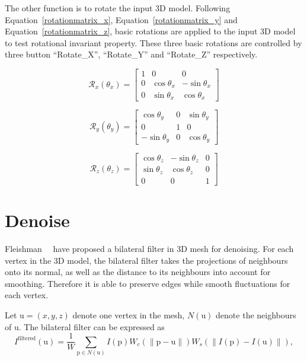 The other function is to rotate the input 3D model. Following Equation~\ref{rotationmatrix_x}, Equation~\ref{rotationmatrix_y} and Equation~\ref{rotationmatrix_z}, basic rotations are applied to the input 3D model to test rotational invariant property. These three basic rotations are controlled by three button ``Rotate\_X'', ``Rotate\_Y'' and ``Rotate\_Z'' respectively. 

\begin{equation} \label{rotationmatrix_x}
  \mathcal{R}_x(\theta_x)=
  \begin{bmatrix}
    1 & 0 & 0 \\
    0 &  \cos{\theta_x} &  -\sin{\theta_x} \\
    0 &  \sin{\theta_x} & \cos{\theta_x}
  \end{bmatrix}
\end{equation}

\begin{equation} \label{rotationmatrix_y}
  \mathcal{R}_y(\theta_y)=
  \begin{bmatrix}
    \cos{\theta_y} & 0 & \sin{\theta_y} \\
    0 & 1 & 0 \\
     -\sin{\theta_y} & 0 & \cos{\theta_y}
  \end{bmatrix} 
\end{equation}

\begin{equation} \label{rotationmatrix_z}
  \mathcal{R}_z(\theta_z)=
  \begin{bmatrix} 
    \cos{\theta_z} &   -\sin{\theta_z} & 0 \\
    \sin{\theta_z} & \cos{\theta_z} & 0 \\
    0 & 0 & 1 
  \end{bmatrix}
\end{equation}

\section{Denoise}

Fleishman~\etal~\cite{fleishman2003bilateral} have proposed a bilateral filter in 3D mesh for denoising. For each vertex in the 3D model, the bilateral filter takes the projections of neighbours onto its normal, as well as the distance to its neighbours into account for smoothing. Therefore it is able to preserve edges while smooth fluctuations for each vertex. 

Let $\bm{\mathrm{u}}=(x,y,z)$ denote one vertex in the mesh, $N(\bm{\mathrm{u}})$ denote the neighbours of $\bm{\mathrm{u}}$. The bilateral filter can be expressed as
\begin{equation} \label{bilaterialfilter}
I^\text{filtered}(\bm{\mathrm{u}}) = \frac{1}{W} \sum_{\bm{\mathrm{p}} \in N(\bm{\mathrm{u}})} I(\bm{\mathrm{p}})W_c(\|\bm{\mathrm{p}}-\bm{\mathrm{u}}\|)W_s(\|I(\bm{\mathrm{p}})-I(\bm{\mathrm{u}})\|),
\end{equation}

